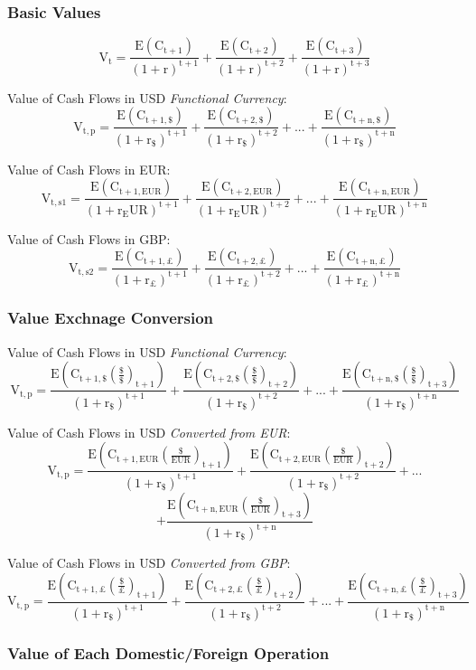 \documentclass[11pt, english]{article}
\begin{document}
		\subsubsection{Basic Values}
	
	$$\mathrm{V_t=\frac{E(C_{t+1})}{(1+r)^{t+1}}+\frac{E(C_{t+2})}{(1+r)^{t+2}}+\frac{E(C_{t+3})}{(1+r)^{t+3}}}$$

	Value of Cash Flows in USD \textit{Functional Currency}:
	$$\mathrm{V_{t,p}=\frac{E(C_{t+1,\$})}{(1+r_\$)^{t+1}}+\frac{E(C_{t+2,\$})}{(1+r_\$)^{t+2}}+...+\frac{E(C_{t+n,{\$}})}{(1+r_\$)^{t+n}}}$$

	Value of Cash Flows in EUR:
	$$\mathrm{V_{t,s1}=\frac{E(C_{t+1,EUR})}{(1+r_EUR)^{t+1}}+\frac{E(C_{t+2,EUR})}{(1+r_EUR)^{t+2}}+...+\frac{E(C_{t+n,{EUR}})}{(1+r_EUR)^{t+n}}}$$

	Value of Cash Flows in GBP:
	$$\mathrm{V_{t,s2}=\frac{E(C_{t+1,\pounds})}{(1+r_\pounds)^{t+1}}+\frac{E(C_{t+2,\pounds})}{(1+r_\pounds)^{t+2}}+...+\frac{E(C_{t+n,{\pounds}})}{(1+r_\pounds)^{t+n}}}$$

		\subsubsection{Value Exchnage Conversion}

	Value of Cash Flows in USD \textit{Functional Currency}:
	$$\mathrm{V_{t,p}=\frac{E\left(C_{t+1,\$}\left(\frac{\$}{\$}\right)_{t+1}\right)}{(1+r_\$)^{t+1}}+\frac{E\left(C_{t+2,\$}\left(\frac{\$}{\$}\right)_{t+2}\right)}{(1+r_\$)^{t+2}}+...+\frac{E\left(C_{t+n,{\$}}\left(\frac{\$}{\$}\right)_{t+3}\right)}{(1+r_\$)^{t+n}}}$$

	Value of Cash Flows in USD \textit{Converted from EUR}:
	$$\mathrm{V_{t,p}=\frac{E\left(C_{t+1,EUR}\left(\frac{\$}{EUR}\right)_{t+1}\right)}{(1+r_\$)^{t+1}}+\frac{E\left(C_{t+2,EUR}\left(\frac{\$}{EUR}\right)_{t+2}\right)}{(1+r_\$)^{t+2}}+...}$$ $$\mathrm{+\frac{E\left(C_{t+n,{EUR}}\left(\frac{\$}{EUR}\right)_{t+3}\right)}{(1+r_\$)^{t+n}}}$$

	Value of Cash Flows in USD \textit{Converted from GBP}:
	$$\mathrm{V_{t,p}=\frac{E\left(C_{t+1,\pounds}\left(\frac{\$}{\pounds}\right)_{t+1}\right)}{(1+r_\$)^{t+1}}+\frac{E\left(C_{t+2,\pounds}\left(\frac{\$}{\pounds}\right)_{t+2}\right)}{(1+r_\$)^{t+2}}+...+\frac{E\left(C_{t+n,{\pounds}}\left(\frac{\$}{\pounds}\right)_{t+3}\right)}{(1+r_\$)^{t+n}}}$$

		\subsubsection{Value of Each Domestic/Foreign Operation}
\end{document}
